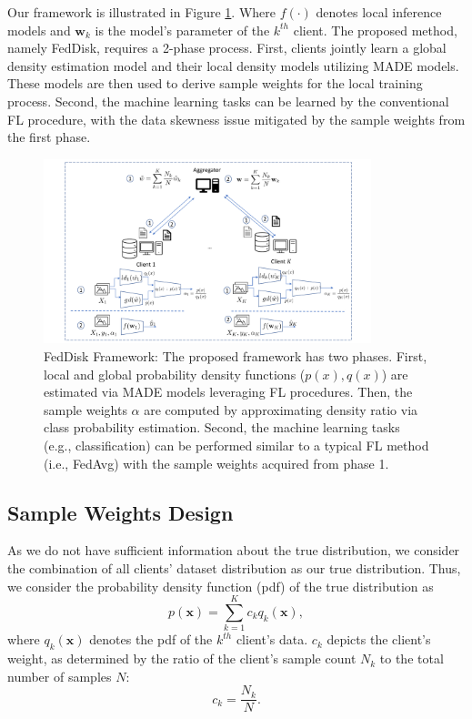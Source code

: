 \documentclass[journal]{IEEEtai}
\newcommand{\MethodnameShort}{FedDisk}
\begin{document}
Our framework is illustrated in Figure \ref{fig:framework}. Where $f(\cdot)$ denotes local inference models and $\mathbf{w}_k$ is the model's parameter of the $k^{th}$ client. The proposed method, namely \MethodnameShort{}, requires a 2-phase process. First, clients jointly learn a global density estimation model and their local density models utilizing MADE models. These models are then used to derive sample weights for the local training process. Second, the machine learning tasks can be learned by the conventional FL procedure, with the data skewness issue mitigated by the sample weights from the first phase.
\begin{figure}[ht!]
		\centering
		\includegraphics[width=0.85\textwidth, trim={1cm 0.1cm 1cm 0.3cm},clip]{Figures/FL}
		\caption{ \MethodnameShort{} Framework: The proposed framework has two phases. First, local and global probability density functions ($p(x),q(x)$) are estimated via MADE models leveraging FL procedures. Then, the sample weights $\alpha$ are computed by approximating density ratio via class probability estimation. Second, the machine learning tasks (e.g., classification) can be performed similar to a typical FL method (i.e., FedAvg) with the sample weights acquired from phase 1.} 
		\label{fig:framework} 

\end{figure}  

\subsection{Sample Weights Design}
\label{sec:sample_weight_design}
As we do not have sufficient information about the true distribution, we consider the combination of all clients' dataset distribution as our true distribution. Thus, we consider the probability density function (pdf) of the true distribution as 
\begin{equation}
\label{eq:sumdist}
	 p(\mathbf{x}) = \sum_{k=1}^{K} c_k q_k(\mathbf{x}) ,
\end{equation}
where $q_k(\mathbf{x})$ denotes the pdf of the $k^{th}$ client's data. $c_k$ depicts the client's weight, as determined by the ratio of the client's sample count $N_k$ to the total number of samples $N$: 
\begin{equation}
	c_k=\frac{N_k}{N}.
\end{equation}
\end{document}
